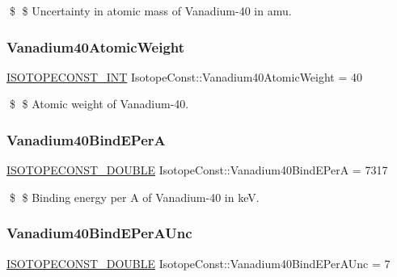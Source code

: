 \$ \$ Uncertainty in atomic mass of Vanadium-\/40 in amu. \mbox{\label{group___isotope_const-_vanadium-_v40_gab27114646169616810f8d51eaf680707}} 
\subsubsection{\texorpdfstring{Vanadium40\+Atomic\+Weight}{Vanadium40AtomicWeight}}
{\footnotesize\ttfamily \mbox{\hyperlink{group___isotope_const-_macros_ga5f18360b3e99483a35c32d789e62621c}{I\+S\+O\+T\+O\+P\+E\+C\+O\+N\+S\+T\+\_\+\+I\+NT}} Isotope\+Const\+::\+Vanadium40\+Atomic\+Weight = 40}

\$ \$ Atomic weight of Vanadium-\/40. \mbox{\label{group___isotope_const-_vanadium-_v40_gaee8f7e990aeef1ea2ee6d7dca7ab5cdf}} 
\subsubsection{\texorpdfstring{Vanadium40\+Bind\+E\+PerA}{Vanadium40BindEPerA}}
{\footnotesize\ttfamily \mbox{\hyperlink{group___isotope_const-_macros_ga8f45a7272ce02c0b4c65c44636ed719a}{I\+S\+O\+T\+O\+P\+E\+C\+O\+N\+S\+T\+\_\+\+D\+O\+U\+B\+LE}} Isotope\+Const\+::\+Vanadium40\+Bind\+E\+PerA = 7317}

\$ \$ Binding energy per A of Vanadium-\/40 in keV. \mbox{\label{group___isotope_const-_vanadium-_v40_gaec47fb5f6db62a4d7917cf1b71f8e04e}} 
\subsubsection{\texorpdfstring{Vanadium40\+Bind\+E\+Per\+A\+Unc}{Vanadium40BindEPerAUnc}}
{\footnotesize\ttfamily \mbox{\hyperlink{group___isotope_const-_macros_ga8f45a7272ce02c0b4c65c44636ed719a}{I\+S\+O\+T\+O\+P\+E\+C\+O\+N\+S\+T\+\_\+\+D\+O\+U\+B\+LE}} Isotope\+Const\+::\+Vanadium40\+Bind\+E\+Per\+A\+Unc = 7}

